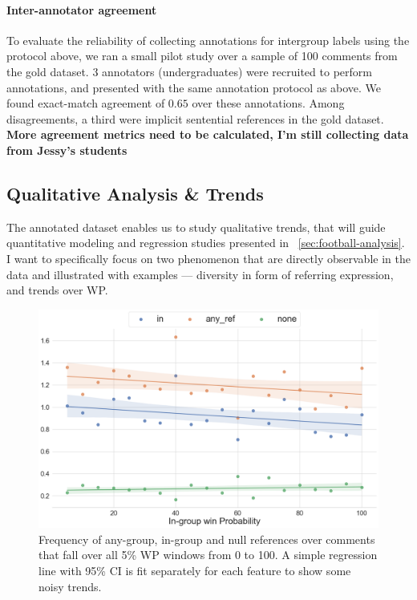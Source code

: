 

\paragraph{Inter-annotator agreement} To evaluate the reliability of collecting annotations for intergroup labels using the protocol above, we ran a small pilot study over a sample of 100 comments from the gold dataset. 3 annotators (undergraduates) were recruited to perform annotations, and presented with the same annotation protocol as above. We found exact-match agreement of $0.65$ over these annotations. Among disagreements, a third were implicit sentential references in the gold dataset. \textbf{More agreement metrics need to be calculated, I'm still collecting data from Jessy's students}


\subsection{Qualitative Analysis \& Trends}
\label{subsec:football-trends}

The annotated dataset enables us to study qualitative trends, that will guide quantitative modeling and regression studies presented in \textsection~\ref{sec:football-analysis}. I want to specifically focus on two phenomenon that are directly observable in the data and illustrated with examples --- diversity in form of referring expression, and trends over WP.

\begin{figure}[t]
    \centering
    \includegraphics[width=\linewidth]{figures/test-trends.png}
    \caption{Frequency of any-group, in-group and null references over comments that fall over all 5\% WP windows from 0 to 100. A simple regression line with 95\% CI is fit separately for each feature to show some noisy trends.}
    \label{fig:test-trends}
\end{figure}

